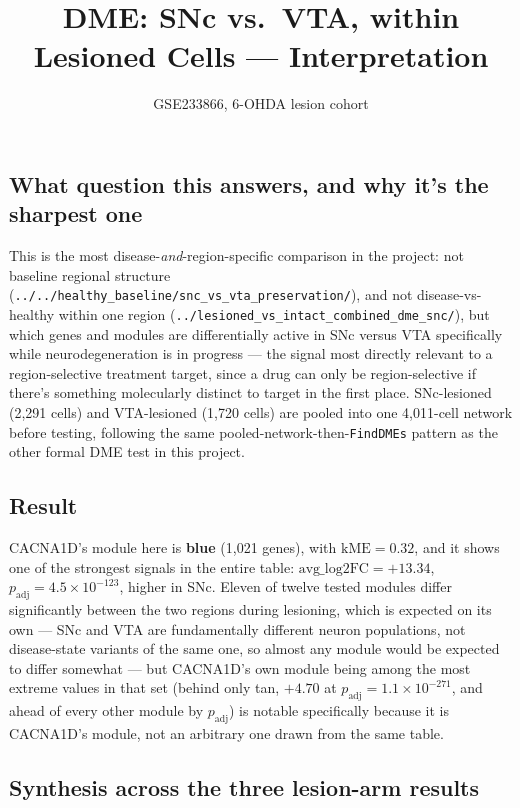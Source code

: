 \documentclass[11pt]{article}
\title{DME: SNc vs.\ VTA, within Lesioned Cells --- Interpretation}
\author{GSE233866, 6-OHDA lesion cohort}
\date{}
\begin{document}
\maketitle

\subsection*{What question this answers, and why it's the sharpest one}

This is the most disease-\emph{and}-region-specific comparison in the
project: not baseline regional structure (\texttt{../../healthy\_baseline/snc\_vs\_vta\_preservation/}),
and not disease-vs-healthy within one region
(\texttt{../lesioned\_vs\_intact\_combined\_dme\_snc/}), but which genes and
modules are differentially active in SNc versus VTA specifically while
neurodegeneration is in progress --- the signal most directly relevant to a
region-selective treatment target, since a drug can only be
region-selective if there's something molecularly distinct to target in the
first place. SNc-lesioned (2{,}291 cells) and VTA-lesioned (1{,}720 cells)
are pooled into one 4{,}011-cell network before testing, following the same
pooled-network-then-\texttt{FindDMEs} pattern as the other formal DME test
in this project.

\subsection*{Result}

CACNA1D's module here is \textbf{blue} (1{,}021 genes), with
$\mathrm{kME}=0.32$, and it shows one of the strongest signals in the
entire table: $\mathrm{avg\_log2FC} = +13.34$, $p_{\mathrm{adj}} =
4.5\times10^{-123}$, higher in SNc. Eleven of twelve tested modules differ
significantly between the two regions during lesioning, which is expected
on its own --- SNc and VTA are fundamentally different neuron populations,
not disease-state variants of the same one, so almost any module would be
expected to differ somewhat --- but CACNA1D's own module being among the
most extreme values in that set (behind only tan, $+4.70$ at
$p_{\mathrm{adj}}=1.1\times10^{-271}$, and ahead of every other module by
$p_{\mathrm{adj}}$) is notable specifically because it is CACNA1D's module,
not an arbitrary one drawn from the same table.

\subsection*{Synthesis across the three lesion-arm results}
\end{document}
